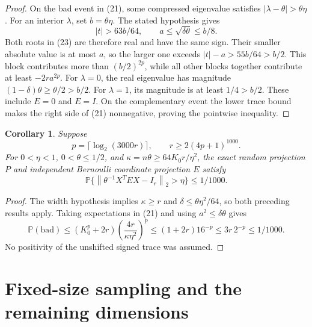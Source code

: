 \documentclass[11pt]{article}
\newtheorem{corollary}[theorem]{Corollary}
\theoremstyle{definition}
\newcommand{\Prob}{\mathbb P}
\newcommand{\norm}[1]{\left\lVert#1\right\rVert_2}
\begin{document}
\begin{proof}
On the bad event in (21), some compressed eigenvalue satisfies
\(|\lambda-\theta|>\theta\eta\). For an interior \(\lambda\), set
\(b=\theta\eta\). The stated hypothesis gives
\[
 |t|>63b/64,\qquad a\le\sqrt{\delta\theta}\le b/8.
\]
Both roots in (23) are therefore real and have the same sign.
Their smaller absolute value is at most \(a\), so the larger one
exceeds \(|t|-a>55b/64>b/2\). This block contributes more than
\((b/2)^{2p}\), while all other blocks together contribute at
least \(-2r a^{2p}\).
For \(\lambda=0\), the real eigenvalue has magnitude
\((1-\delta)\theta\ge\theta/2>b/2\).
For \(\lambda=1\), its magnitude is at least \(1/4>b/2\).
These include \(E=0\) and \(E=I\).
On the complementary event the lower trace bound makes the right
side of (21) nonnegative, proving the pointwise inequality.
\end{proof}

\begin{corollary}\label{cor:bernoulli}
Suppose
\[
 p=\lceil\log_2(3000r)\rceil,\qquad r\ge2(4p+1)^{1000}.
\]
For \(0<\eta<1\), \(0<\theta\le1/2\), and
\(\kappa=n\theta\ge64K_0r/\eta^2\), the exact random projection \(P\)
and independent Bernoulli coordinate projection \(E\) satisfy
\[
 \Prob\{\norm{\theta^{-1}X^TEX-I_r}>\eta\}\le1/1000.              \tag{24}
\]
\end{corollary}
\begin{proof}
The width hypothesis implies \(\kappa\ge r\) and
\(\delta\le\theta\eta^2/64\), so both preceding results apply.
Taking expectations in (21) and using \(a^2\le\delta\theta\) gives
\[
 \Prob(\text{bad})
 \le(K_0^p+2r)\left(\frac{4r}{\kappa\eta^2}\right)^p
 \le(1+2r)16^{-p}\le3r\,2^{-p}\le1/1000.
\]
No positivity of the unshifted signed trace was assumed.
\end{proof}

\section{Fixed-size sampling and the remaining dimensions}
\end{document}
